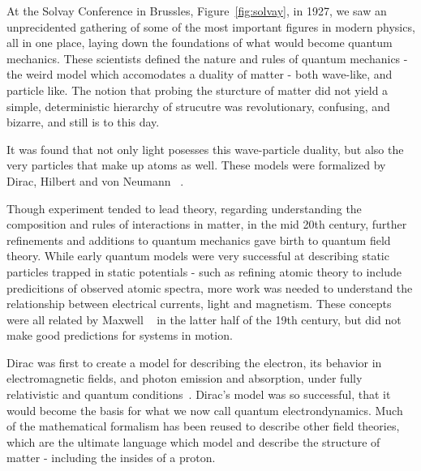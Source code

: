 At the Solvay Conference in Brussles, Figure~\ref{fig:solvay}, in 1927, we saw
an unprecidented gathering of some of the most important figures in modern
physics, all in one place, laying down the foundations of what would become
quantum mechanics. These scientists defined the nature and rules of quantum
mechanics - the weird model which accomodates a duality of matter - both
wave-like, and particle like. The notion that probing the sturcture of matter
did not yield a simple, deterministic hierarchy of strucutre was revolutionary,
confusing, and bizarre, and still is to this day.

It was found that not only light posesses this wave-particle duality, but also
the very particles that make up atoms as well. These models were formalized by
Dirac, Hilbert and von Neumann ~\needcite{}.

Though experiment tended to lead theory, regarding understanding the composition
and rules of interactions in matter, in the mid 20th century, further
refinements and additions to quantum mechanics gave birth to quantum field
theory. While early quantum models were very successful at describing static
particles trapped in static potentials - such as refining atomic theory to
include predicitions of observed atomic spectra, more work was needed to
understand the relationship between electrical currents, light and magnetism.
These concepts were all related by Maxwell ~\needcite{} in the latter half of
the 19th century, but did not make good predictions for systems in motion.

Dirac was first to create a model for describing the electron, its behavior in
electromagnetic fields, and photon emission and absorption, under fully
relativistic and quantum conditions~\needcite{}. Dirac's model was so
successful, that it would become the basis for what we now call quantum
electrondynamics. Much of the mathematical formalism has been reused to describe
other field theories, which are the ultimate language which model and describe
the structure of matter - including the insides of a proton. 

